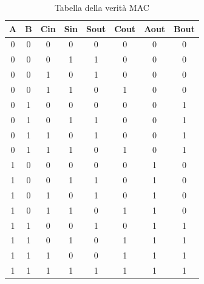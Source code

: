 \documentclass[10pt]{article}
\begin{document}
\begin{itemize}
\begin{table}[H]
    \centering
    \begin{tabular}{|cccc|cccc|}
    \hline
    \textbf{A} & \textbf{B} & \textbf{Cin} & \textbf{Sin} & \textbf{Sout} & \textbf{Cout} & \textbf{Aout} & \textbf{Bout} \\ \hline
    0          & 0          & 0            & 0            & 0             & 0             & 0             & 0             \\ 
    0          & 0          & 0            & 1            & 1             & 0             & 0             & 0             \\ 
    0          & 0          & 1            & 0            & 1             & 0             & 0             & 0             \\ 
    0          & 0          & 1            & 1            & 0             & 1             & 0             & 0             \\ 
    0          & 1          & 0            & 0            & 0             & 0             & 0             & 1             \\ 
    0          & 1          & 0            & 1            & 1             & 0             & 0             & 1             \\ 
    0          & 1          & 1            & 0            & 1             & 0             & 0             & 1             \\ 
    0          & 1          & 1            & 1            & 0             & 1             & 0             & 1             \\ 
    1          & 0          & 0            & 0            & 0             & 0             & 1             & 0             \\ 
    1          & 0          & 0            & 1            & 1             & 0             & 1             & 0             \\ 
    1          & 0          & 1            & 0            & 1             & 0             & 1             & 0             \\ 
    1          & 0          & 1            & 1            & 0             & 1             & 1             & 0             \\ 
    1          & 1          & 0            & 0            & 1             & 0             & 1             & 1             \\ 
    1          & 1          & 0            & 1            & 0             & 1             & 1             & 1             \\ 
    1          & 1          & 1            & 0            & 0             & 1             & 1             & 1             \\ 
    1          & 1          & 1            & 1            & 1             & 1             & 1             & 1             \\ \hline
    \end{tabular}
    \caption{Tabella della verità MAC}
    \label{tab:my-table}
    \end{table}


\end{itemize}
\end{document}
